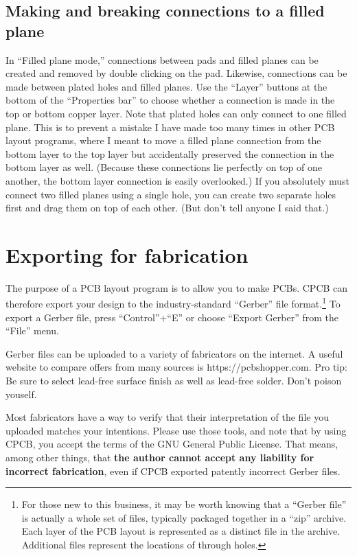 \documentclass[11pt]{report}
\begin{document}
\subsection{Making and breaking connections to a filled plane}

In ``Filled plane mode,'' connections between pads and filled
planes can be created and removed by double clicking on the
pad. Likewise, connections can be made between plated holes and filled
planes. Use the ``Layer'' buttons at the bottom of the ``Properties
bar'' to choose whether a connection is made in the top or bottom
copper layer. Note that plated holes can only connect to one filled
plane. This is to prevent a mistake I have made too many times in
other PCB layout programs, where I meant to move a filled plane
connection from the bottom layer to the top layer but accidentally
preserved the connection in the bottom layer as well. (Because these
connections lie perfectly on top of one another, the bottom layer
connection is easily overlooked.) If you absolutely must connect two
filled planes using a single hole, you can create two separate holes
first and drag them on top of each other. (But don't tell anyone I
said that.)

\section{Exporting for fabrication}

The purpose of a PCB layout program is to allow you to make PCBs. CPCB
can therefore export your design to the industry-standard ``Gerber''
file format.\footnote{For those new to this business, it may be worth
  knowing that a ``Gerber file'' is actually a whole set of files,
  typically packaged together in a ``zip'' archive.
 Each layer of the PCB layout is represented as a distinct file in the
 archive. Additional files represent the locations of through holes.}
To export a Gerber file, press ``Control''+``E'' or choose ``Export
Gerber'' from the ``File'' menu.

Gerber files can be uploaded to a variety of fabricators on the
internet. A useful website to compare offers from many sources is
https://pcbshopper.com. Pro tip: Be sure to select lead-free surface
finish as well as lead-free solder. Don't poison youself.

Most fabricators have a way to verify that their interpretation of the
file you uploaded matches your intentions. Please use those
tools, and note that by using CPCB, you accept the terms of the GNU
General Public License. That means, among other things, that {\bf the
author cannot accept any liability for incorrect fabrication}, even if
CPCB exported patently incorrect Gerber files.
\end{document}
